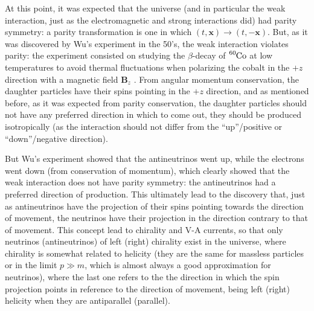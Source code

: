 At this point, it was expected that the universe (and in particular the weak interaction, just as the electromagnetic and strong interactions did) had parity symmetry: a parity transformation is one in which $(t, \bm{x}) \rightarrow (t, -\bm{x})$. But, as it was discovered by Wu's experiment in the 50's, the weak interaction violates parity: the experiment consisted on studying the $\beta$-decay of $\ce{^{60}\textrm{Co}}$ at low temperatures to avoid thermal fluctuations when polarizing the cobalt in the $+z$ direction with a magnetic field $\bm{B}_z$ \cite{Nagashima}. From angular momentum conservation, the daughter particles have their spins pointing in the $+z$ direction, and as mentioned before, as it was expected from parity conservation, the daughter particles should not have any preferred direction in which to come out, they should be produced isotropically (as the interaction should not differ from the ``up''/positive or ``down''/negative direction).

But Wu's experiment showed that the antineutrinos went up, while the electrons went down (from conservation of momentum), which clearly showed that the weak interaction does not have parity symmetry: the antineutrinos had a preferred direction of production. This ultimately lead to the discovery that, just as antineutrinos have the projection of their spins pointing towards the direction of movement, the neutrinos have their projection in the direction contrary to that of movement. This concept lead to chirality and V-A currents, so that only neutrinos (antineutrinos) of left (right) chirality exist in the universe, where chirality is somewhat related to helicity (they are the same for massless particles \cite{Lahiri} or in the limit $p \gg m$, which is almost always a good approximation for neutrinos), where the last one refers to the the direction in which the spin projection points in reference to the direction of movement, being left (right) helicity when they are antiparallel (parallel).

